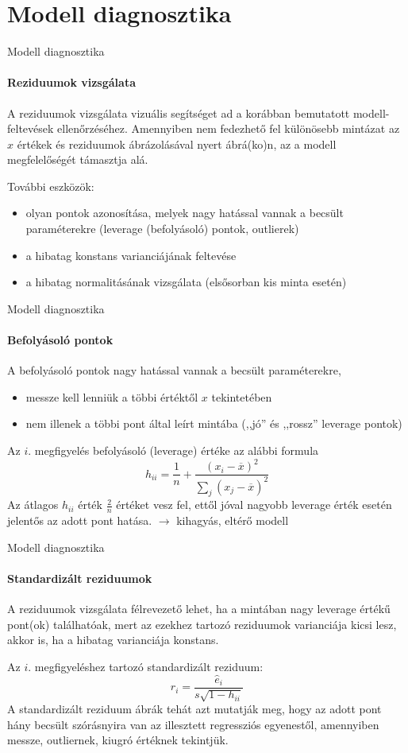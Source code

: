 \documentclass[10pt]{beamer}
\begin{document}
\section{Modell diagnosztika}

\begin{frame}{Modell diagnosztika}
\framesubtitle{Reziduumok vizsgálata}
A reziduumok vizsgálata vizuális segítséget ad a korábban bemutatott modell-feltevések ellenőrzéséhez. Amennyiben nem fedezhető fel különösebb mintázat az $x$ értékek és reziduumok ábrázolásával nyert ábrá(ko)n, az a modell megfelelőségét támasztja alá.

További eszközök:
\begin{itemize}
\item olyan pontok azonosítása, melyek nagy hatással vannak a becsült paraméterekre (leverage (befolyásoló) pontok, outlierek)
\item a hibatag konstans varianciájának feltevése
\item a hibatag normalitásának vizsgálata (elsősorban kis minta esetén)
\end{itemize}
\end{frame}

\begin{frame}{Modell diagnosztika}
\framesubtitle{Befolyásoló pontok}
A befolyásoló pontok nagy hatással vannak a becsült paraméterekre,
\begin{itemize}
\item messze kell lenniük a többi értéktől $x$ tekintetében
\item nem illenek a többi pont által leírt mintába (,,jó'' és ,,rossz'' leverage pontok)  
\end{itemize}
Az $i$. megfigyelés befolyásoló (leverage) értéke az alábbi formula
\[
h_{ii}=\dfrac{1}{n}+\dfrac{\left(x_i-\overline{x}\right)^2}{\sum_j \left(x_j-\overline{x}\right)^2}
\]
Az átlagos $h_{ii}$ érték $\frac{2}{n}$ értéket vesz fel, ettől jóval nagyobb leverage érték esetén jelentős az adott pont hatása. $\to$ kihagyás, eltérő modell
\end{frame}

\begin{frame}{Modell diagnosztika}
\framesubtitle{Standardizált reziduumok}
A reziduumok vizsgálata félrevezető lehet, ha a mintában nagy leverage értékű pont(ok) találhatóak, mert az ezekhez tartozó reziduumok varianciája kicsi lesz, akkor is, ha a hibatag varianciája konstans.

Az $i$. megfigyeléshez tartozó standardizált reziduum:
\[
r_i = \dfrac{\hat{e}_i}{s\sqrt{1-h_{ii}}}
\]
A standardizált reziduum ábrák tehát azt mutatják meg, hogy az adott pont hány becsült szórásnyira van az illesztett regressziós egyenestől, amennyiben messze, outliernek, kiugró értéknek tekintjük.
\end{frame}
\end{document}

